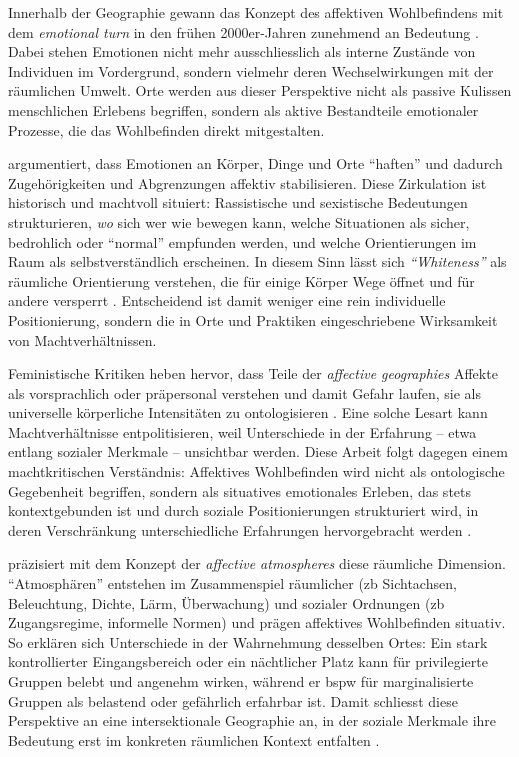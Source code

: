 Innerhalb der Geographie gewann das Konzept des affektiven Wohlbefindens mit dem \emph{emotional turn} in den frühen 2000er-Jahren zunehmend an Bedeutung \parencite{hoSocialGeographyIII2024}. Dabei stehen Emotionen nicht mehr ausschliesslich als interne Zustände von Individuen im Vordergrund, sondern vielmehr deren Wechselwirkungen mit der räumlichen Umwelt. Orte werden aus dieser Perspektive nicht als passive Kulissen menschlichen Erlebens begriffen, sondern als aktive Bestandteile emotionaler Prozesse, die das Wohlbefinden direkt mitgestalten.

\textcite{ahmedAffectiveEconomies2004} argumentiert, dass Emotionen an Körper, Dinge und Orte \enquote{haften} und dadurch Zugehörigkeiten und Abgrenzungen affektiv stabilisieren. Diese Zirkulation ist historisch und machtvoll situiert: Rassistische und sexistische Bedeutungen strukturieren, \emph{wo} sich wer wie bewegen kann, welche Situationen als sicher, bedrohlich oder \enquote{normal} empfunden werden, und welche Orientierungen im Raum als selbstverständlich erscheinen. In diesem Sinn lässt sich \textit{\enquote{Whiteness}} als räumliche Orientierung verstehen, die für einige Körper Wege öffnet und für andere versperrt \parencite{ahmedPhenomenologyWhiteness2007}. Entscheidend ist damit weniger eine rein individuelle Positionierung, sondern die in Orte und Praktiken eingeschriebene Wirksamkeit von Machtverhältnissen.

Feministische Kritiken heben hervor, dass Teile der \emph{affective geographies} Affekte als vorsprachlich oder präpersonal verstehen und damit Gefahr laufen, sie als universelle körperliche Intensitäten zu ontologisieren \parencite{hemmingsInvokingAffectCultural2005,andersonAffectiveAtmospheres2009}. Eine solche Lesart kann Machtverhältnisse entpolitisieren, weil Unterschiede in der Erfahrung -- etwa entlang sozialer Merkmale -- unsichtbar werden. Diese Arbeit folgt dagegen einem machtkritischen Verständnis: Affektives Wohlbefinden wird nicht als ontologische Gegebenheit begriffen, sondern als situatives emotionales Erleben, das stets kontextgebunden ist und durch soziale Positionierungen strukturiert wird, in deren Verschränkung unterschiedliche Erfahrungen hervorgebracht werden \parencite{ahmedAffectiveEconomies2004,rodo-de-zarateIntersectionalitySpatialityEmotions2023}.

\textcite{andersonAffectiveAtmospheres2009} präzisiert mit dem Konzept der \emph{affective atmospheres} diese räumliche Dimension. \enquote{Atmosphären} entstehen im Zusammenspiel räumlicher (\gls{zb} Sichtachsen, Beleuchtung, Dichte, Lärm, Überwachung) und sozialer Ordnungen (\gls{zb} Zugangsregime, informelle Normen) und prägen affektives Wohlbefinden situativ. So erklären sich Unterschiede in der Wahrnehmung desselben Ortes: Ein stark kontrollierter Eingangsbereich oder ein nächtlicher Platz kann für privilegierte Gruppen belebt und angenehm wirken, während er \gls{bspw} für marginalisierte Gruppen als belastend oder gefährlich erfahrbar ist. Damit schliesst diese Perspektive an eine intersektionale Geographie an, in der soziale Merkmale ihre Bedeutung erst im konkreten räumlichen Kontext entfalten \parencite{valentineTheorizingResearchingIntersectionality2007,rodo-de-zarateIntersectionalityFeministGeographies2018}.

